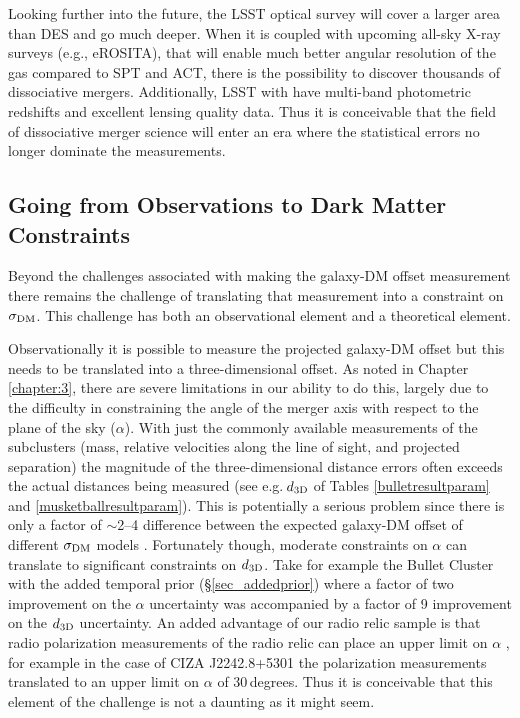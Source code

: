 Looking further into the future, the LSST optical survey \citep{Tyson:2002hn} will cover a larger area than DES and go much deeper.
When it is coupled with upcoming all-sky X-ray surveys (e.g., eROSITA), that will enable much better angular resolution of the gas compared to SPT and ACT, there is the possibility to discover thousands of dissociative mergers.
Additionally, LSST with have multi-band photometric redshifts and excellent lensing quality data.
Thus it is conceivable that the field of dissociative merger science will enter an era where the statistical errors no longer dominate the measurements. 

\subsection{Going from Observations to Dark Matter Constraints}

Beyond the challenges associated with making the galaxy-DM offset measurement there remains the challenge of translating that measurement into a constraint on $\sigma_{\rm DM}$.
This challenge has both an observational element and a theoretical element.

Observationally it is possible to measure the projected galaxy-DM offset but this needs to be translated into a three-dimensional offset.
As noted in Chapter \ref{chapter:3}, there are severe limitations in our ability to do this, largely due to the difficulty in constraining the angle of the merger axis with respect to the plane of the sky ($\alpha$).
With just the commonly available measurements of the subclusters (mass, relative velocities along the line of sight, and projected separation) the magnitude of the three-dimensional distance errors often exceeds the actual distances being measured (see e.g.\,$d_{\rm 3D}$ of Tables \ref{bulletresultparam} and \ref{musketballresultparam}).
This is potentially a serious problem since there is only a factor of $\sim$2--4 difference between the expected galaxy-DM offset of different $\sigma_{\rm DM}$ models \citep{Markevitch:2004dl, Kahlhoefer:2013wp}.
Fortunately though, moderate constraints on $\alpha$ can translate to significant constraints on 
$d_{\rm 3D}$.
Take for example the Bullet Cluster with the added temporal prior (\S\ref{sec_addedprior}) where a factor of two improvement on the $\alpha$ uncertainty was accompanied by a factor of 9 improvement on the $d_{\rm 3D}$ uncertainty.
An added advantage of our radio relic sample is that radio polarization measurements of the radio relic can place an upper limit on $\alpha$ \citep{Ensslin:1998tx}, for example in the case of CIZA J2242.8+5301 the polarization measurements translated to an upper limit on $\alpha$ of 30\,degrees.
Thus it is conceivable that this element of the challenge is not a daunting as it might seem.

